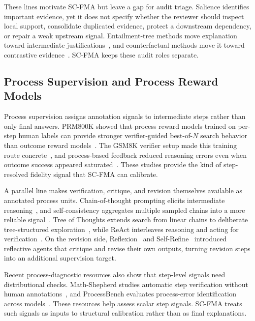 \documentclass[a4paper,fleqn]{cas-sc}
\begin{document}
These lines motivate SC-FMA but leave a gap for audit triage. Salience identifies important evidence, yet it does not specify whether the reviewer should inspect local support, consolidate duplicated evidence, protect a downstream dependency, or repair a weak upstream signal. Entailment-tree methods move explanation toward intermediate justifications~\cite{dalvi2021entailmenttrees}, and counterfactual methods move it toward contrastive evidence~\cite{wijekoon2023counterfactual}. SC-FMA keeps these audit roles separate.

\subsection{Process Supervision and Process Reward Models}

Process supervision assigns annotation signals to intermediate steps rather than only final answers. PRM800K showed that process reward models trained on per-step human labels can provide stronger verifier-guided best-of-$N$ search behavior than outcome reward models~\cite{lightman2023verify}. The GSM8K verifier setup made this training route concrete~\cite{cobbe2021training}, and process-based feedback reduced reasoning errors even when outcome success appeared saturated~\cite{uesato2022solving}. These studies provide the kind of step-resolved fidelity signal that SC-FMA can calibrate.

A parallel line makes verification, critique, and revision themselves available as annotated process units. Chain-of-thought prompting elicits intermediate reasoning~\cite{wei2022cot}, and self-consistency aggregates multiple sampled chains into a more reliable signal~\cite{wang2022selfconsistency}. Tree of Thoughts extends search from linear chains to deliberate tree-structured exploration~\cite{yao2023tot}, while ReAct interleaves reasoning and acting for verification~\cite{yao2022react}. On the revision side, Reflexion~\cite{shinn2023reflexion} and Self-Refine~\cite{madaan2023selfrefine} introduced reflective agents that critique and revise their own outputs, turning revision steps into an additional supervision target.

Recent process-diagnostic resources also show that step-level signals need distributional checks. Math-Shepherd studies automatic step verification without human annotations~\cite{wang2024mathshepherd}, and ProcessBench evaluates process-error identification across models~\cite{zheng2024processbench}. These resources help assess scalar step signals. SC-FMA treats such signals as inputs to structural calibration rather than as final explanations.
\end{document}
